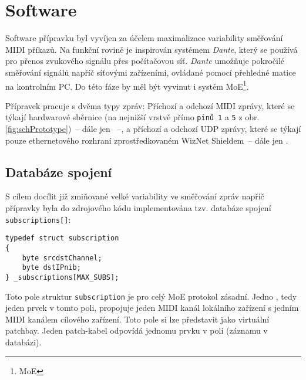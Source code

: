 \section{Software}
Software přípravku byl vyvíjen za účelem maximalizace variability směřování \acs{MIDI} příkazů. Na funkční rovině je inspirován systémem \emph{Dante}, který se používá pro přenos zvukového signálu přes počítačovou síť. \emph{Dante} umožňuje pokročilé směřování signálů napříč síťovými zařízeními, ovládané pomocí přehledné matice na kontrolním PC. Do této fáze by měl být vyvinut i systém \acs{MoE}\footnote{\acl{MoE}}.

Přípravek pracuje s dvěma typy zpráv: Příchozí a odchozí \acs{MIDI} zprávy, které se týkají hardwarové sběrnice (na nejnižší vrstvě přímo \texttt{pinů 1} a \texttt{5} z obr. \ref{fig:schPrototype})~-- dále jen ~--, a příchozí a odchozí UDP zprávy, které se týkají pouze ethernetového rozhraní zprostředkovaném WizNet Shieldem~-- dále jen .
\subsection{Databáze spojení}\label{chpt:DatSpoj}
S cílem docílit již zmiňované velké variability ve směřování zpráv napříč přípravky byla do zdrojového kódu implementována tzv. databáze spojení \texttt{sub\-scrip\-tions[]}:
\begin{lstlisting}
typedef struct subscription
{
    byte srcdstChannel;
    byte dstIPnib;
} _subscriptions[MAX_SUBS];
\end{lstlisting}
Toto pole struktur \texttt{subscription} je pro celý \acs{MoE} protokol zásadní. Jedno , tedy jeden prvek v tomto poli, propojuje jeden \acs{MIDI} kanál lokálního zařízení s jedním \acs{MIDI} kanálem cílového zařízení. Toto pole si lze představit jako virtuální patchbay. Jeden patch-kabel odpovídá jednomu prvku v poli (záznamu v databázi). 

